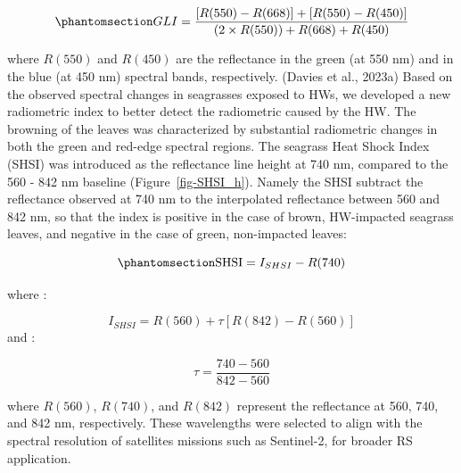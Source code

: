 \documentclass[
  letterpaper,
  11pt,
  english,
  singlespacing,
  headsepline]{MastersDoctoralThesis}
\begin{document}
\begin{spacing}{1.5}
\begin{equation}\phantomsection\label{eq-gli}{
GLI = \frac{[R(550)-R(668)]+[R(550)-R(450)]}{(2 \times R(550) )+ R(668) + R(450) }
}\end{equation}

where \(R(550)\) and \(R(450)\) are the reflectance in the green (at 550
nm) and in the blue (at 450 nm) spectral bands, respectively. (Davies et
al., 2023a) Based on the observed spectral changes in seagrasses exposed
to HWs, we developed a new radiometric index to better detect the
radiometric caused by the HW. The browning of the leaves was
characterized by substantial radiometric changes in both the green and
red-edge spectral regions. The seagrass Heat Shock Index (SHSI) was
introduced as the reflectance line height at 740 nm, compared to the 560
- 842 nm baseline (Figure~\ref{fig-SHSI_h}). Namely the SHSI subtract
the reflectance observed at 740 nm to the interpolated reflectance
between 560 and 842 nm, so that the index is positive in the case of
brown, HW-impacted seagrass leaves, and negative in the case of green,
non-impacted leaves:

\begin{equation}\phantomsection\label{eq-SDI}{
\text{SHSI} = I_{SHSI} - R(740)
}\end{equation}

where :

\[
I_{SHSI} = R(560) + \tau    [R(842) - R(560)]
\] and :

\[
\tau = \frac{740 - 560}{842 - 560}
\]

where \(R(560)\), \(R(740)\), and \(R(842)\) represent the reflectance
at 560, 740, and 842 nm, respectively. These wavelengths were selected
to align with the spectral resolution of satellites missions such as
Sentinel-2, for broader RS application.

\begin{figure}

\centering{

}
\end{figure}
\end{spacing}
\end{document}

